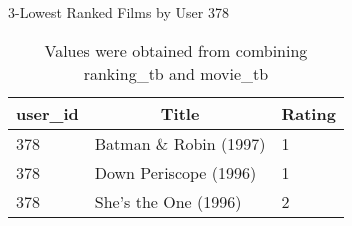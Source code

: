 \begin{table}[!htbp]
	\caption{3-Lowest Ranked Films by User 378} \label{tab:lowest-378}
	\begin{center}
	\vspace{-5mm}
		\begin{tabular}{ l l l }
			\hline
			\multicolumn{1}{c}{user\_id} & \multicolumn{1}{c}{Title} & \multicolumn{1}{c}{Rating}\\
			\hline
     		378 & Batman \& Robin (1997)  &     1\\
     		378 & Down Periscope (1996)  &      1\\
     		378 & She's the One (1996)   &      2\\
			\hline
		\end{tabular}
	\caption*{\scriptsize Values were obtained from combining ranking\_tb and movie\_tb}
	 \end{center}
\end{table}